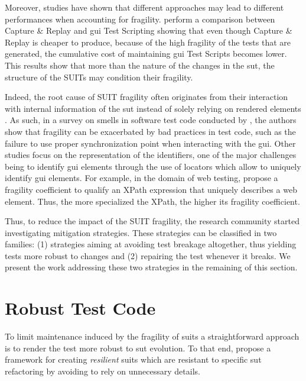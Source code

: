 Moreover, studies have shown that different approaches may lead to different performances when accounting for fragility. \textcite{Leotta2013, Leotta2014} perform a comparison between Capture \& Replay and \gls{gui} Test Scripting showing that even though Capture \& Replay is cheaper to produce, because of the high fragility of the tests that are generated, the cumulative cost of maintaining \gls{gui} Test Scripts becomes lower. This results show that more than the nature of the changes in the \gls{sut}, the structure of the SUITs may condition their fragility. 

Indeed, the root cause of SUIT fragility often originates from their interaction with internal information of the \gls{sut} instead of solely relying on rendered elements \cite{Yandrapally2014}. As such, in a survey on smells in software test code conducted by \textcite{Garousi2018}, the authors show that fragility can be exacerbated by bad practices in test code, such as the failure to use proper synchronization point when interacting with the \gls{gui}. Other studies focus on the representation of the identifiers, one of the major challenges being to identify \gls{gui} elements through the use of locators \cite{Hammoudi2016} which allow to uniquely identify \gls{gui} elements. For example, in the domain of web testing, \textcite{Leotta2015} propose a fragility coefficient to qualify an XPath expression that uniquely describes a web element. Thus, the more specialized the XPath, the higher its fragility coefficient.

Thus, to reduce the impact of the SUIT fragility, the research community started investigating mitigation strategies. These strategies can be classified in two families: (1) strategies aiming at avoiding test breakage altogether, thus yielding tests more robust to changes and (2) repairing the test whenever it breaks. We present the work addressing these two strategies in the remaining of this section.

\section{Robust Test Code}
\label{sec:related-robust}

To limit maintenance induced by the fragility of \gls{suit}s a straightforward approach is to render the test more robust to \gls{sut} evolution. To that end, \textcite{Pirzadeh2014} propose a framework for creating \emph{resilient} \gls{suit}s which are resistant to specific \gls{sut} refactoring by avoiding to rely on unnecessary details. 

